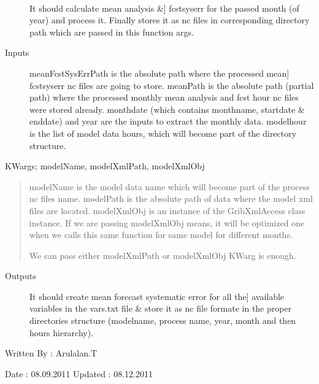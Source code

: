 \documentclass[letterpaper,10pt,english]{sphinxmanual}
\begin{document}
\begin{fulllineitems}
\label{diagnosis:compute_month_fcst_sys_error.genMonthFcstSysErrFiles}~\begin{description}
\item[{}] \leavevmode{[}It should calculate mean analysis \&{]}
fcstsyserr for the passed month (of year) and process it. Finally
stores it as nc files in corresponding directory path which are
passed in this function args.

\item[{Inputs}] \leavevmode{[}meanFcstSysErrPath is the absolute path where the processed mean{]}
fcstsyserr nc files are going to store.
meanPath is the absolute path (partial path) where the processed
monthly mean analysis and fcst hour nc files were stored already.
monthdate (which contains monthname, startdate \& enddate) and
year are the inputs to extract the monthly data.
modelhour is the list of model data hours, which will become
part of the directory structure.

\end{description}

KWargs: modelName, modelXmlPath, modelXmlObj
\begin{quote}

modelName is the model data name which will become part of the
process nc files name.
modelPath is the absolute path of data where the model xml files
are located.
modelXmlObj is an instance of the GribXmlAccess class instance.
If we are passing modelXmlObj means, it will be optimized one
when we calls this same function for same model for different
months.

We can pass either modelXmlPath or modelXmlObj KWarg is enough.
\end{quote}
\begin{description}
\item[{Outputs}] \leavevmode{[}It should create mean forecast systematic error for all the{]}
available variables in the vars.txt file \& store it as nc file
formate in the proper directories structure
(modelname, process name, year, month and then hours hierarchy).

\end{description}

Written By : Arulalan.T

Date : 08.09.2011
Updated : 08.12.2011

\end{fulllineitems}
\end{document}

